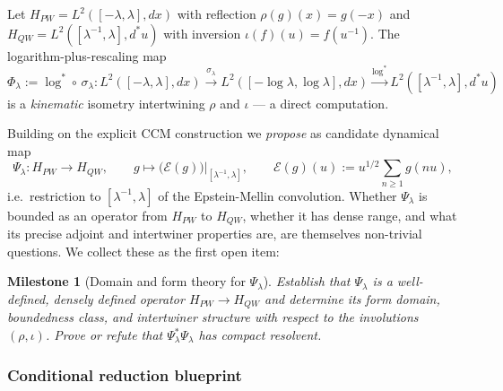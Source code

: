 \documentclass[11pt,a4paper]{article}
\theoremstyle{plain}
\newtheorem{milestone}[theorem]{Milestone}
\theoremstyle{definition}
\begin{document}
Let $H_{PW} = L^2([-\lambda, \lambda], dx)$ with reflection
$\rho(g)(x) = g(-x)$ and $H_{QW} = L^2([\lambda^{-1}, \lambda],
d^\ast u)$ with inversion $\iota(f)(u) = f(u^{-1})$.  The
logarithm-plus-rescaling map
\[
  \Phi_\lambda := \log^\ast \circ \, \sigma_\lambda :
    L^2([-\lambda, \lambda], dx) \xrightarrow{\sigma_\lambda}
    L^2([-\log\lambda, \log\lambda], dx)
    \xrightarrow{\log^\ast}
    L^2([\lambda^{-1}, \lambda], d^\ast u)
\]
is a \emph{kinematic} isometry intertwining $\rho$ and $\iota$ --- a
direct computation.

Building on the explicit CCM construction we \emph{propose} as
candidate dynamical map
\[
  \Psi_\lambda : H_{PW} \longrightarrow H_{QW}, \qquad
    g \mapsto \big(\mathcal E(g)\big)\big|_{[\lambda^{-1},\lambda]},
  \qquad \mathcal E(g)(u) := u^{1/2} \sum_{n \ge 1} g(nu),
\]
i.e.\ restriction to $[\lambda^{-1},\lambda]$ of the Epstein-Mellin
convolution.  Whether $\Psi_\lambda$ is bounded as an operator from
$H_{PW}$ to $H_{QW}$, whether it has dense range, and what its
precise adjoint and intertwiner properties are, are themselves
non-trivial questions.  We collect these as the first open item:

\begin{milestone}[Domain and form theory for $\Psi_\lambda$]
\label{ms:psi-domain}
Establish that $\Psi_\lambda$ is a well-defined, densely defined
operator $H_{PW} \to H_{QW}$ and determine its form domain,
boundedness class, and intertwiner structure with respect to the
involutions $(\rho, \iota)$.  Prove or refute that
$\Psi_\lambda^\ast \Psi_\lambda$ has compact resolvent.
\end{milestone}

\subsubsection{Conditional reduction blueprint}
\end{document}
